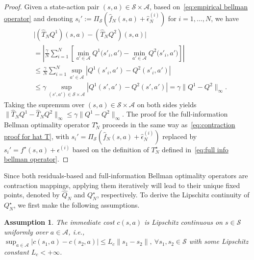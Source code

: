 \documentclass[letterpaper, 10 pt, conference]{ieeeconf}  %
\newtheorem{assumption}{Assumption}
\begin{document}
\begin{proof}
Given a state-action pair $(s,a)\in\mathcal{S}\times\mathcal{A}$, based on\ \eqref{eq:empirical bellman operator} and denoting
$s_i':=\Pi_{\mathcal S} (\hat f_{N}(s,a)+\hat\epsilon_N^{(i)})$ for $i=1,\ldots,N$, we have
\allowdisplaybreaks
\begin{align}\label{eq:contraction proof for hat T}
& \bigl|(\hat{T}_N Q^{1})(s,a)-(\hat{T}_N Q^{2})(s,a)\bigr| \nonumber\\
&= \left|\frac{\gamma}{N}\sum_{i=1}^{N}
\left[
\min_{a'\in\mathcal A} Q^{1}\!\bigl(s'_i,a'\bigr)
- \min_{a'\in\mathcal A} Q^{2}\!\bigl(s'_i,a'\bigr)
\right]\right| \nonumber \\
&\le \frac{\gamma}{N}\sum_{i=1}^{N} \sup_{a'\in\mathcal A}
\left|Q^{1}(s'_i,a')-Q^{2}(s'_i,a')\right| \nonumber \\
&\le \gamma \sup_{(s',a')\in\mathcal{S}\times\mathcal{A}}
\left|Q^{1}(s',a')-Q^{2}(s',a')\right| = \gamma \|Q^{1}-Q^{2}\|_\infty.
\end{align}
Taking the supremum over $(s,a)\in\mathcal{S}\times\mathcal{A}$ on both sides yields $\|\hat{T}_N Q^{1}-\hat{T}_N Q^{2}\|_\infty
\le \gamma \|Q^{1}-Q^{2}\|_\infty$.
The proof for the full-information Bellman optimality operator $T_N^\star$ proceeds in the same way as\ \eqref{eq:contraction proof for hat T}, with $s_i'=\Pi_{\mathcal S}(\hat f_N(s,a)+\hat\epsilon_N^{(i)})$ replaced by $s_i'=f^\star(s,a)+\epsilon^{(i)}$ based on the definition of $T_N^\star$ defined in\ \eqref{eq:full info bellman operator}. 
\end{proof}

Since both residuals-based and full-information Bellman optimality operators are contraction mappings, applying them iteratively will lead to their unique fixed points, denoted by $\hat{Q}_N$ and $Q_N^\star$, respectively. To derive the Lipschitz continuity of $Q_N^\star$, we first make the following assumptions.

\begin{assumption}\label{ass:cost}
The immediate cost $c(s,a)$ is Lipschitz continuous on $s \in \mathcal S$ uniformly over $a \in \mathcal A$, i.e., $\sup_{a\in\mathcal A}|c(s_1,a)-c(s_2,a)| \le L_c\|s_1-s_2\|,\ \forall s_1,s_2 \in \mathcal S$
with some Lipschitz constant $L_c<+\infty$.
\end{assumption}
\end{document}
